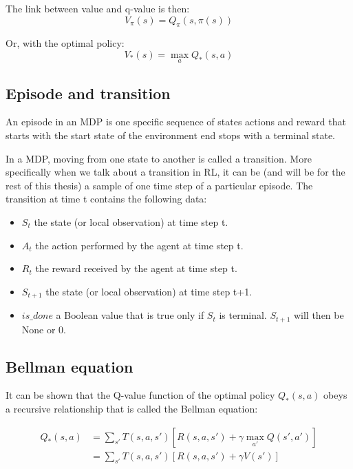 The link between value and q-value is then:
\begin{equation}
    V_\pi(s) = Q_\pi(s,\pi(s))
\end{equation}

Or, with the optimal policy:
\begin{equation}
    V_*(s) = \max_a Q_*(s,a)
\end{equation}

\subsection{Episode and transition} \label{sec:episodes and transitions}

An episode in an MDP is one specific sequence of states actions and reward that starts with the start state of the environment end stops with a terminal state. 

In a MDP, moving from one state to another is called a transition. More specifically when we talk about a transition in RL, it can be (and will be for the rest of this thesis) a sample of one time step of a particular episode. The transition at time t contains the following data:\\

\begin{itemize}
    \item $S_t$ the state (or local observation) at time step t.
    \item $A_t$ the action performed by the agent at time step t.
    \item $R_t$ the reward received by the agent at time step t.
    \item $S_{t+1}$ the state (or local observation) at time step t+1.
    \item $is\_done$ a Boolean value that is true only if $S_t$ is terminal. $S_{t+1}$ will then be None or 0.
\end{itemize}

\subsection{Bellman equation}

It can be shown that the Q-value function of the optimal policy $Q_*(s,a)$ obeys a recursive relationship that is called the Bellman equation:

\begin{align}\label{eq:bellman}
    Q_*(s,a) &= \sum_{s'} T(s,a,s') [R(s,a,s')+\gamma \max_{a'}Q(s',a')]\\
             &= \sum_{s'} T(s,a,s') [R(s,a,s')+\gamma V(s')]
\end{align}

